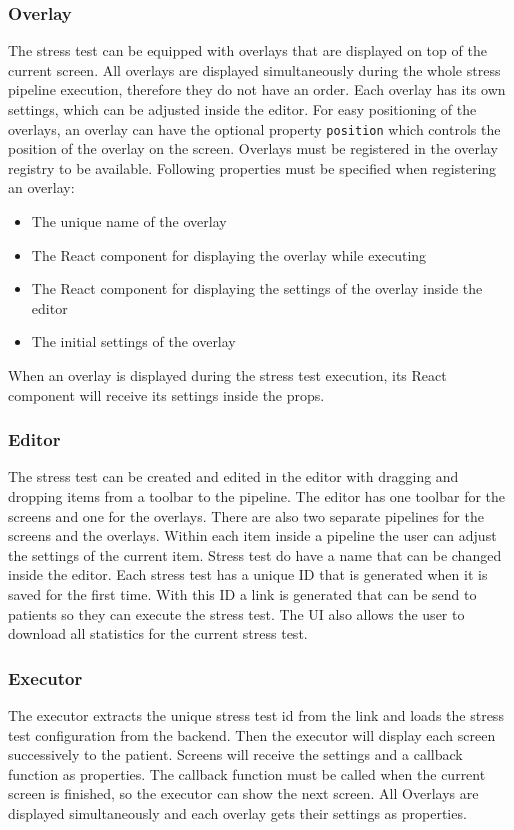 \subsubsection{Overlay}
The stress test can be equipped with overlays that are displayed on top of the current screen. 
All overlays are displayed simultaneously during the whole stress pipeline execution, therefore they do not have an order. 
Each overlay has its own settings, which can be adjusted inside the editor.
For easy positioning of the overlays, an overlay can have the optional property \texttt{position} which controls the position of the overlay on the screen.
Overlays must be registered in the overlay registry to be available.
Following properties must be specified when registering an overlay:
\begin{itemize}
  \item The unique name of the overlay
  \item The React component for displaying the overlay while executing
  \item The React component for displaying the settings of the overlay inside the editor
  \item The initial settings of the overlay
\end{itemize}

When an overlay is displayed during the stress test execution, its React component will receive its settings inside the props.

\subsubsection{Editor}
The stress test can be created and edited in the editor with dragging and dropping items from a toolbar to the pipeline.
The editor has one toolbar for the screens and one for the overlays. 
There are also two separate pipelines for the screens and the overlays. 
Within each item inside a pipeline the user can adjust the settings of the current item. 
Stress test do have a name that can be changed inside the editor.
Each stress test has a unique ID that is generated when it is saved for the first time.
With this ID a link is generated that can be send to patients so they can execute the stress test.
The UI also allows the user to download all statistics for the current stress test.

\subsubsection{Executor}
The executor extracts the unique stress test id from the link and loads the stress test configuration from the backend.
Then the executor will display each screen successively to the patient. 
Screens will receive the settings and a callback function as properties. 
The callback function must be called when the current screen is finished, so the executor can show the next screen. 
All Overlays are displayed simultaneously and each overlay gets their settings as properties.


